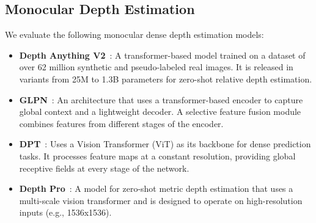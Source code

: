 \subsection{Monocular Depth Estimation}
We evaluate the following monocular dense depth estimation models:
\label{sec:monocular_depth_estimation}
\begin{itemize}
	\item \textbf{Depth Anything V2}~\cite{yang_depth_2024}: A transformer-based model trained on a dataset of over 62 million synthetic and pseudo-labeled real images. It is released in variants from 25M to 1.3B parameters for zero-shot relative depth estimation.

	\item \textbf{GLPN}~\cite{kim_global-local_2022}: An architecture that uses a transformer-based encoder to capture global context and a lightweight decoder. A selective feature fusion module combines features from different stages of the encoder.

	\item \textbf{DPT}~\cite{ranftl_vision_2021}: Uses a Vision Transformer (ViT) as its backbone for dense prediction tasks. It processes feature maps at a constant resolution, providing global receptive fields at every stage of the network.

	\item \textbf{Depth Pro}~\cite{bochkovskii_depth_2025}: A model for zero-shot metric depth estimation that uses a multi-scale vision transformer and is designed to operate on high-resolution inputs (e.g., 1536x1536).
\end{itemize}


